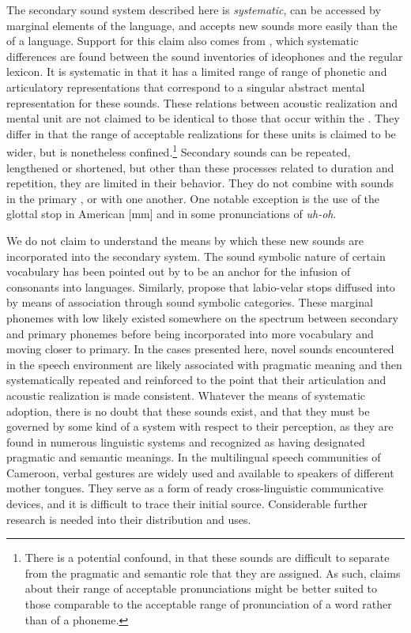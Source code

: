 \documentclass[output=paper
,newtxmath
,modfonts
,nonflat]{langsci/langscibook}
\begin{document}
The secondary sound system described here is \textit{systematic}, can be accessed by marginal elements of the language, and accepts new sounds more easily than the  of a language. Support for this claim also comes from \citet{nuckollsetal2016}, which systematic differences are found between the sound inventories of  ideophones and the regular lexicon. It is systematic in that it has a limited range of range of phonetic and articulatory representations that correspond to a singular abstract mental representation for these sounds. These relations between acoustic realization and mental unit are not claimed to be identical to those that occur within the . They differ in that the range of acceptable realizations for these units is claimed to be wider, but is nonetheless confined.\footnote{There is a potential confound, in that these sounds are difficult to separate from the pragmatic and semantic role that they are assigned. As such, claims about their range of acceptable pronunciations might be better suited to those comparable to the acceptable range of pronunciation of a word rather than of a phoneme.} Secondary sounds can be repeated, lengthened or shortened, but other than these processes related to duration and repetition, they are limited in their behavior. They do not combine with sounds in the primary , or with one another. One notable exception is the use of the glottal stop in American  [\textglotstop m\textglotstop m] and in some pronunciations of \textit{uh-oh}.

We do not  claim to understand the means by which these new sounds are incorporated into the secondary system. The sound symbolic nature of certain vocabulary has been pointed out by \citet{BostoenSands2012} to be an anchor for the infusion of  consonants into  languages. Similarly, \citet{BostoenDonzo2013} propose that labio-velar stops diffused into  by means of association through sound symbolic categories. These marginal phonemes with low  likely existed somewhere on the spectrum between secondary and primary phonemes before being incorporated into more vocabulary and moving closer to primary. In the cases presented here, novel sounds encountered in the speech environment are likely associated with pragmatic meaning and then systematically repeated and reinforced to the point that their articulation and acoustic realization is made consistent. Whatever the means of systematic adoption, there is no doubt that these sounds exist, and that they must be governed by some kind of a system with respect to their perception, as they are found in numerous linguistic systems and recognized as having designated pragmatic and semantic meanings. In the multilingual speech communities of Cameroon, verbal gestures are widely used and available to speakers of different mother tongues. They serve as a form of ready cross-linguistic communicative devices, and it is difficult to trace their initial source. Considerable further research is needed into their distribution and uses.\\
\vspace{2em}
\end{document}
